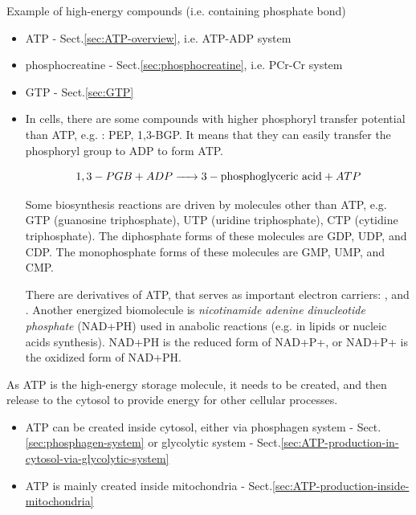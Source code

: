 Example of high-energy compounds (i.e. containing phosphate bond)
\begin{itemize}
  \item ATP - Sect.\ref{sec:ATP-overview}, i.e. ATP-ADP system 
  
  \item phosphocreatine - Sect.\ref{sec:phosphocreatine}, i.e. PCr-Cr system

  \item GTP - Sect.\ref{sec:GTP}
   
   \label{sec:PEP}
   \label{sec:1,3-BGP}
  \item In cells, there are some compounds with higher phosphoryl transfer
potential than ATP, e.g. : PEP, 1,3-BGP. It means that they can easily transfer
the phosphoryl group to ADP to form ATP.

\begin{equation}
  \label{eq:4}
  1,3-PGB + ADP \ce{->} 3-\text{phosphoglyceric acid} + ATP
\end{equation}

\begin{framed}
  Some biosynthesis reactions are driven by molecules other than ATP,
  e.g. GTP (guanosine triphosphate), UTP (uridine triphosphate), CTP
  (cytidine triphosphate).  The diphosphate forms of these molecules
  are GDP, UDP, and CDP. The monophosphate forms of these molecules
  are GMP, UMP, and CMP. 

  There are derivatives of ATP, that serves as important electron
  carriers: , and .  Another energized biomolecule is
  {\it nicotinamide adenine dinucleotide phosphate} (NAD+PH) used in
  anabolic reactions (e.g. in lipids or nucleic acids synthesis).
  NAD+PH is the reduced form of NAD+P+, or NAD+P+ is the oxidized form
  of NAD+PH.

\end{framed}



\end{itemize}

As ATP is the high-energy storage molecule, it needs to be created, and then
release to the cytosol to provide energy for other cellular processes.
\begin{itemize}
  \item ATP can be created inside cytosol, either via phosphagen system -
  Sect.\ref{sec:phosphagen-system} or glycolytic system -
  Sect.\ref{sec:ATP-production-in-cytosol-via-glycolytic-system}
  
  \item ATP is mainly created inside mitochondria -
  Sect.\ref{sec:ATP-production-inside-mitochondria}
\end{itemize}

